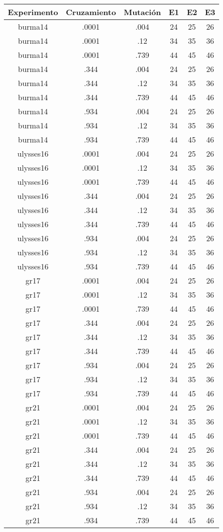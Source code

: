 \documentclass[letterpaper,11pt]{article}
\begin{document}
 
\begin{tabular}{|c|c|c|c|c|c|}
\hline
	\textbf{Experimento} & \textbf{Cruzamiento} & \textbf{Mutaci\'on} & \textbf{E1} & \textbf{E2} & \textbf{E3}\\
\hline
	burma14 & .0001 & .004 & 24 & 25 & 26\\
\hline
	burma14 & .0001 & .12 & 34 & 35 & 36\\
\hline
	burma14 & .0001 & .739 & 44 & 45 & 46\\
\hline
	burma14 & .344 & .004 & 24 & 25 & 26\\
\hline
	burma14 & .344 & .12 & 34 & 35 & 36\\
\hline
	burma14 & .344 & .739 & 44 & 45 & 46\\
\hline
	burma14 & .934 & .004 & 24 & 25 & 26\\
\hline
	burma14 & .934 & .12 & 34 & 35 & 36\\
\hline
	burma14 & .934 & .739 & 44 & 45 & 46\\
\hline
	 ulysses16 & .0001 & .004 & 24 & 25 & 26\\
\hline
	 ulysses16 & .0001 & .12 & 34 & 35 & 36\\
\hline
	ulysses16 & .0001 & .739 & 44 & 45 & 46\\
\hline
	ulysses16 & .344 & .004 & 24 & 25 & 26\\
\hline
	ulysses16 & .344 & .12 & 34 & 35 & 36\\
\hline
	ulysses16 & .344 & .739 & 44 & 45 & 46\\
\hline
	ulysses16 & .934 & .004 & 24 & 25 & 26\\
\hline
	ulysses16 & .934 & .12 & 34 & 35 & 36\\
\hline
	ulysses16 & .934 & .739 & 44 & 45 & 46\\
\hline
	gr17 & .0001 & .004 & 24 & 25 & 26\\
\hline
	gr17 & .0001 & .12 & 34 & 35 & 36\\
\hline
	gr17 & .0001 & .739 & 44 & 45 & 46\\
\hline
	gr17 & .344 & .004 & 24 & 25 & 26\\
\hline
	gr17 & .344 & .12 & 34 & 35 & 36\\
\hline
	gr17 & .344 & .739 & 44 & 45 & 46\\
\hline
	gr17 & .934 & .004 & 24 & 25 & 26\\
\hline
	gr17 & .934 & .12 & 34 & 35 & 36\\
\hline
	gr17 & .934 & .739 & 44 & 45 & 46\\
\hline
	gr21 & .0001 & .004 & 24 & 25 & 26\\
\hline
	gr21 & .0001 & .12 & 34 & 35 & 36\\
\hline
	gr21 & .0001 & .739 & 44 & 45 & 46\\
\hline
	gr21 & .344 & .004 & 24 & 25 & 26\\
\hline
	gr21 & .344 & .12 & 34 & 35 & 36\\
\hline
	gr21 & .344 & .739 & 44 & 45 & 46\\
\hline
	gr21 & .934 & .004 & 24 & 25 & 26\\
\hline
	gr21 & .934 & .12 & 34 & 35 & 36\\
\hline
	gr21 & .934 & .739 & 44 & 45 & 46\\
\hline
\end{tabular}
\end{document}
